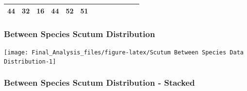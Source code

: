 \begin{longtable}[]{@{}lcccccccccccc@{}}
\begin{minipage}[t]{0.05\columnwidth}
44\strut
\end{minipage} & \begin{minipage}[t]{0.05\columnwidth}\centering\strut
32\strut
\end{minipage} & \begin{minipage}[t]{0.05\columnwidth}\centering\strut
16\strut
\end{minipage} & \begin{minipage}[t]{0.05\columnwidth}\centering\strut
44\strut
\end{minipage} & \begin{minipage}[t]{0.05\columnwidth}\centering\strut
52\strut
\end{minipage} & \begin{minipage}[t]{0.05\columnwidth}\centering\strut
51\strut
\end{minipage}\tabularnewline
\bottomrule
\end{longtable}

\subsubsection{Between Species Scutum
Distribution}\label{between-species-scutum-distribution}

\begin{Shaded}
\begin{Highlighting}[]
\NormalTok{(}\NormalTok{(}\NormalTok{,}\NormalTok{))}
\NormalTok{(sternite$SCUTUM[sternite$SPECIES==}\NormalTok{], }\NormalTok{, }\NormalTok{)}
\NormalTok{(sternite$SCUTUM[sternite$SPECIES==}\NormalTok{], }\NormalTok{, }\NormalTok{)}
\end{Highlighting}
\end{Shaded}

\begin{center}\texttt{[image: Final\_Analysis\_files/figure-latex/Scutum Between Species Data Distribution-1]} \end{center}

\subsubsection{Between Species Scutum Distribution -
Stacked}\label{between-species-scutum-distribution---stacked}

